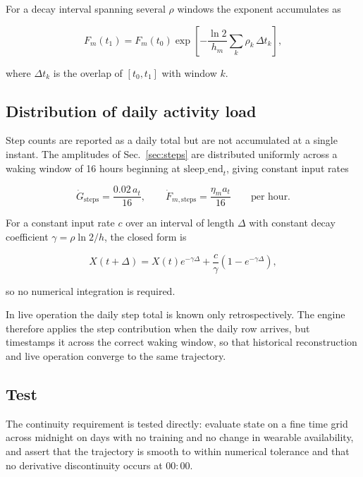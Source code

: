 \documentclass[11pt]{article}
\begin{document}
For a decay interval spanning several $\rho$ windows the exponent accumulates as

\begin{equation}
F_m(t_1)=F_m(t_0)\exp\left[-\frac{\ln 2}{h_m}\sum_k \rho_k\,\Delta t_k\right],
\end{equation}

where $\Delta t_k$ is the overlap of $[t_0,t_1]$ with window $k$.

\subsection{Distribution of daily activity load}

Step counts are reported as a daily total but are not accumulated at a single instant. The amplitudes of Sec.~\ref{sec:steps} are distributed uniformly across a waking window of 16 hours beginning at $\mathrm{sleep\_end}_t$, giving constant input rates

\begin{equation}
\dot G_{\mathrm{steps}}=\frac{0.02\,a_t}{16},
\qquad
\dot F_{m,\mathrm{steps}}=\frac{\eta_m a_t}{16}
\qquad\text{per hour.}
\end{equation}

For a constant input rate $c$ over an interval of length $\Delta$ with constant decay coefficient $\gamma=\rho\ln2/h$, the closed form is

\begin{equation}
X(t+\Delta)=X(t)e^{-\gamma\Delta}+\frac{c}{\gamma}\left(1-e^{-\gamma\Delta}\right),
\end{equation}

so no numerical integration is required.

In live operation the daily step total is known only retrospectively. The engine therefore applies the step contribution when the daily row arrives, but timestamps it across the correct waking window, so that historical reconstruction and live operation converge to the same trajectory.

\subsection{Test}

The continuity requirement is tested directly: evaluate state on a fine time grid across midnight on days with no training and no change in wearable availability, and assert that the trajectory is smooth to within numerical tolerance and that no derivative discontinuity occurs at $00{:}00$.
\end{document}
